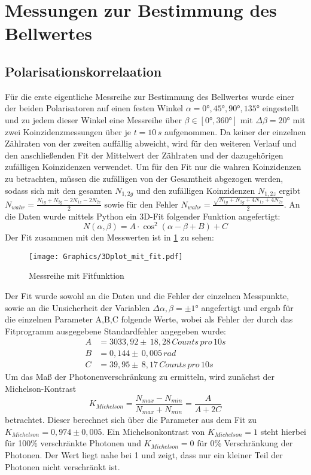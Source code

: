 \documentclass[twoside,colorback,accentcolor=tud4c,11pt]{tudreport}
\begin{document}
\section{Messungen zur Bestimmung des Bellwertes}
\subsection{Polarisationskorrelaation}
Für die erste eigentliche Messreihe zur Bestimmung des Bellwertes wurde einer der beiden Polarisatoren auf einen festen Winkel $\alpha=0°,45°,90°,135°$ eingestellt und zu jedem dieser Winkel eine Messreihe über $\beta\in[0°,360°]$ mit $\Delta\beta=20°$ mit zwei Koinzidenzmessungen über je $t=10\,\si{s}$ aufgenommen. Da keiner der einzelnen Zählraten von der zweiten auffällig abweicht, wird für den weiteren Verlauf und den anschließenden Fit der Mittelwert der Zählraten und der dazugehörigen zufälligen Koinzidenzen verwendet.
Um für den Fit nur die wahren Koinzidenzen zu betrachten, müssen die zufälligen von der Gesamtheit abgezogen werden, sodass sich mit den gesamten $N_{1,2g}$ und den zufälligen Koinzidenzen $N_{1,2z}$ ergibt $N_{wahr}=\frac{N_{1g}+N_{2g}-2N_{1z}-2N_{2z}}{2}$ sowie für den Fehler $N_{wahr}=\frac{\sqrt{N_{1g}+N_{2g}+4N_{1z}+4N_{2z}}}{2}$. An die Daten wurde mittels Python ein 3D-Fit folgender Funktion angefertigt:
\begin{equation}
N(\alpha,\beta)=A\cdot\cos^2(\alpha-\beta+B)+C
\end{equation}
Der Fit zusammen mit den Messwerten ist in \ref{3dfit} zu sehen:
\begin{figure}[H]
\centering
   	\begin{minipage}[b]{1.0\textwidth}
   	\texttt{[image: Graphics/3Dplot\_mit\_fit.pdf]}
   	\caption{Messreihe mit Fitfunktion}
  	\label{3dfit}
   	\end{minipage}
\end{figure}
Der Fit wurde sowohl an die Daten und die Fehler der einzelnen Messpunkte, sowie an die Unsicherheit der Variablen $\Delta\alpha,\beta=\pm1°$ angefertigt und ergab für die einzelnen Parameter A,B,C folgende Werte, wobei als Fehler der durch das Fitprogramm ausgegebene Standardfehler angegeben wurde:
\begin{align}
A&=3033,92\pm\,18,28\,\si{Counts\,pro\,10s} \\
B&=0,144\pm\,0,005\,\si{rad} \\
C&=39,95\pm\,8,17\,\si{Counts\,pro\,10s}
\end{align}
Um das Maß der Photonenverschränkung zu ermitteln, wird zunächst der Michelson-Kontrast 
\begin{equation}
K_{Michelson}=\frac{N_{max}-N_{min}}{N_{max}+N_{min}}=\frac{A}{A+2C}
\end{equation}
betrachtet. Dieser berechnet sich über die Parameter aus dem Fit zu $K_{Michelson}=0,974\pm0,005$. Ein Michelsonkontrast von $K_{Michelson}=1$ steht hierbei für 100\% verschränkte Photonen und $K_{Michelson}=0$ für 0\% Verschränkung der Photonen. Der Wert liegt nahe bei 1 und zeigt, dass nur ein kleiner Teil der Photonen nicht verschränkt ist.
\end{document}
